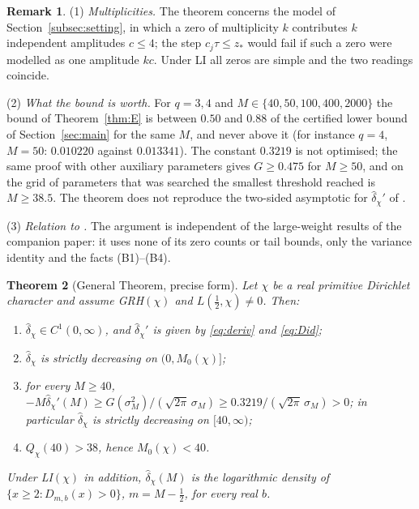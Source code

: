 \documentclass[11pt]{amsart}
\newtheorem{theorem}{Theorem}[section]
\theoremstyle{definition}
\newtheorem{remark}[theorem]{Remark}
\numberwithin{equation}{section}
\newcommand{\hd}{\widehat\delta}
\begin{document}
\begin{remark}\label{rem:Enotes}
(1) \emph{Multiplicities.} The theorem concerns the model of
Section~\ref{subsec:setting}, in which a zero of multiplicity $k$
contributes $k$ independent amplitudes $c\le4$; the step
$c_j\tau\le z_*$ would fail if such a zero were modelled as one
amplitude $kc$. Under LI all zeros are simple and the two readings
coincide.

(2) \emph{What the bound is worth.} For $q=3,4$ and
$M\in\{40,50,100,400,2000\}$ the bound of Theorem~\ref{thm:E} is
between $0.50$ and $0.88$ of the certified lower bound of
Section~\ref{sec:main} for the same $M$, and never above it (for
instance $q=4$, $M=50$: $0.010220$ against $0.013341$). The constant
$0.3219$ is not optimised; the same proof with other auxiliary
parameters gives $G\ge0.475$ for $M\ge50$, and on the grid of
parameters that was searched the smallest threshold reached is
$M\ge38.5$. The theorem does not reproduce the two-sided asymptotic
for $\hd_\chi'$ of \cite[Theorem~4]{WR}.

(3) \emph{Relation to \cite{WR}.} The argument is independent of the
large-weight results of the companion paper: it uses none of its zero
counts or tail bounds, only the variance identity and the facts (B1)--(B4).
\end{remark}

\begin{theorem}[General Theorem, precise form]\label{thm:general}
Let $\chi$ be a real primitive Dirichlet character and assume
GRH$(\chi)$ and $L(\tfrac12,\chi)\ne0$. Then:
\begin{enumerate}
\item[(i)] $\hd_\chi\in C^1(0,\infty)$, and $\hd_\chi'$ is given by
\eqref{eq:deriv} and \eqref{eq:Did};
\item[(ii)] $\hd_\chi$ is strictly decreasing on $(0,M_0(\chi)]$;
\item[(iii)] for every $M\ge40$,
$-M\hd_\chi'(M)\ge G(\sigma_M^2)/(\sqrt{2\pi}\,\sigma_M)
\ge0.3219/(\sqrt{2\pi}\,\sigma_M)>0$; in particular $\hd_\chi$ is
strictly decreasing on $[40,\infty)$;
\item[(iv)] $Q_\chi(40)>38$, hence $M_0(\chi)<40$.
\end{enumerate}
Under LI$(\chi)$ in addition, $\hd_\chi(M)$ is the logarithmic density
of $\{x\ge2:D_{m,b}(x)>0\}$, $m=M-\tfrac12$, for every real $b$.
\end{theorem}
\end{document}
